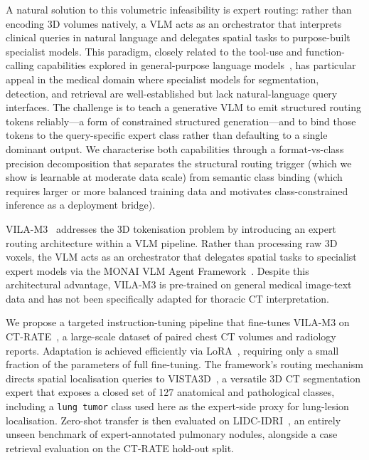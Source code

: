\documentclass[lineno,referee,pdflatex,sn-mathphys-num]{sn-jnl}
\begin{document}
A natural solution to this volumetric infeasibility is expert routing: rather
than encoding 3D volumes natively, a VLM acts as an orchestrator that
interprets clinical queries in natural language and delegates spatial tasks
to purpose-built specialist models. This paradigm, closely related to the
tool-use and function-calling capabilities explored in general-purpose
language models~\cite{schick2023toolformer}, has particular appeal in the
medical domain where specialist models for segmentation, detection, and
retrieval are well-established but lack natural-language query interfaces.
The challenge is to teach a generative VLM to emit structured routing tokens
reliably---a form of constrained structured generation---and to bind those
tokens to the query-specific expert class rather than defaulting to a single
dominant output. We characterise both capabilities through a
format-vs-class precision decomposition that separates the structural
routing trigger (which we show is learnable at moderate data scale) from
semantic class binding (which requires larger or more balanced training
data and motivates class-constrained inference as a deployment bridge).

VILA-M3~\cite{vilaM32024} addresses the 3D tokenisation problem by
introducing an expert routing architecture within a VLM pipeline. Rather
than processing raw 3D voxels, the VLM acts as an orchestrator that
delegates spatial tasks to specialist expert models via the MONAI VLM
Agent Framework~\cite{monai2022}. Despite this architectural advantage,
VILA-M3 is pre-trained on general medical image-text data and has not been
specifically adapted for thoracic CT interpretation.

We propose a targeted instruction-tuning pipeline that fine-tunes VILA-M3
on CT-RATE~\cite{ctrate2024}, a large-scale dataset of paired chest CT
volumes and radiology reports. Adaptation is achieved efficiently via
LoRA~\cite{lora2022}, requiring only a small fraction of the parameters of
full fine-tuning. The framework's routing mechanism directs spatial
localisation queries to VISTA3D~\cite{vista3d2024}, a versatile 3D CT
segmentation expert that exposes a closed set of 127 anatomical and
pathological classes, including a \texttt{lung tumor} class used here as
the expert-side proxy for lung-lesion localisation. Zero-shot transfer is
then evaluated on LIDC-IDRI~\cite{lidc2011}, an entirely unseen benchmark
of expert-annotated pulmonary nodules, alongside a case retrieval
evaluation on the CT-RATE hold-out split.
\end{document}
